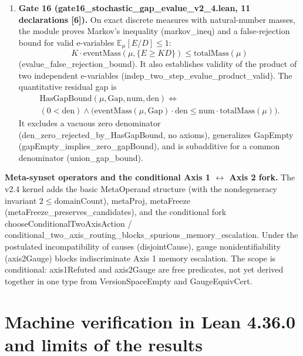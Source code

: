 \documentclass[11pt,a4paper]{article}
\begin{document}
\begin{enumerate}
\item \textbf{Gate 16 (gate16\_\allowbreak stochastic\_\allowbreak gap\_\allowbreak evalue\_\allowbreak v2\_\allowbreak 4.lean, 11 declarations [6]).} On exact discrete measures with natural-number masses, the module proves Markov's inequality (markov\_\allowbreak ineq) and a false-rejection bound for valid e-variables \(\mathbb E_\mu[E/D]\le1\):
\[
K\cdot\mathrm{eventMass}(\mu,\{E\ge KD\})\le\mathrm{totalMass}(\mu)
\]
(evalue\_\allowbreak false\_\allowbreak rejection\_\allowbreak bound). It also establishes validity of the product of two independent e-variables (indep\_\allowbreak two\_\allowbreak step\_\allowbreak evalue\_\allowbreak product\_\allowbreak valid). The quantitative residual gap is
\[
\begin{gathered}
\mathrm{HasGapBound}(\mu,\mathrm{Gap},\mathrm{num},\mathrm{den})\Longleftrightarrow\\
(0<\mathrm{den})\land
\bigl(\mathrm{eventMass}(\mu,\mathrm{Gap})\cdot\mathrm{den}
\le\mathrm{num}\cdot\mathrm{totalMass}(\mu)\bigr).
\end{gathered}
\]
It excludes a vacuous zero denominator (den\_\allowbreak zero\_\allowbreak rejected\_\allowbreak by\_\allowbreak HasGapBound, no axioms), generalizes GapEmpty (gapEmpty\_\allowbreak implies\_\allowbreak zero\_\allowbreak gapBound), and is subadditive for a common denominator (union\_\allowbreak gap\_\allowbreak bound).

\end{enumerate}
\textbf{Meta-synset operators and the conditional Axis 1 \(\leftrightarrow\) Axis 2 fork.} The v2.4 kernel adds the basic MetaOperand structure (with the nondegeneracy invariant \(2\le\mathrm{domainCount}\)), metaProj, metaFreeze (metaFreeze\_\allowbreak preserves\_\allowbreak candidates), and the conditional fork chooseConditionalTwoAxisAction / conditional\_\allowbreak two\_\allowbreak axis\_\allowbreak routing\_\allowbreak blocks\_\allowbreak spurious\_\allowbreak memory\_\allowbreak escalation. Under the postulated incompatibility of causes (disjointCause), gauge nonidentifiability (axis2Gauge) blocks indiscriminate Axis 1 memory escalation. The scope is conditional: axis1Refuted and axis2Gauge are free predicates, not yet derived together in one type from VersionSpaceEmpty and GaugeEquivCert.

\section{Machine verification in Lean 4.36.0 and limits of the results}
\end{document}
